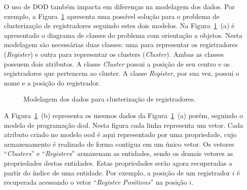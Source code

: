 O uso de DOD também impacta em diferenças na modelagem dos dados. Por exemplo, a Figura~\ref{fig:modelo_register_clustering} apresenta uma possível solução para o problema de clusterização de registradores seguindo estes dois modelos.
Na Figura~\ref{fig:modelo_register_clustering}~(a) é apresentado o diagrama de classes do problema com orientação a objetos. Nesta modelagem são necessárias duas classes: uma para representar os registradores (\textit{Register}) e outra para representar os clusters (\textit{Cluster}). Ambas as classes possuem dois atributos. A classe \textit{Cluster} possui a posição de seu centro e os registradores que pertencem ao cluster. A classe \textit{Register}, por sua vez, possui o nome e a posição do registrador.

\begin{figure}[h!t]
    \centering
    \caption{Modelagem dos dados para clusterização de registradores.}
    \label{fig:modelo_register_clustering}
\end{figure}


A Figura~\ref{fig:modelo_register_clustering}~(b) representa os mesmos dados da Figura~\ref{fig:modelo_register_clustering}~(a) porém, seguindo o modelo de programação \ac{dod}.
Nesta figura cada linha representa um vetor.
Cada atributo criado no modelo \ac{ood} é aqui representado por uma propriedade, cujo armazenamento é realizado de forma contígua em um único vetor.
Os vetores ``\textit{Clusters}'' e ``\textit{Registers}'' armazenam as entidades, sendo os demais vetores as propriedades destas entidades.
Estas propriedades serão agora recuperadas a partir do índice de uma entidade.
Por exemplo, a posição de um registrador $i$ é recuperada acessando o vetor ``\textit{Register Positions}'' na posição $i$.


